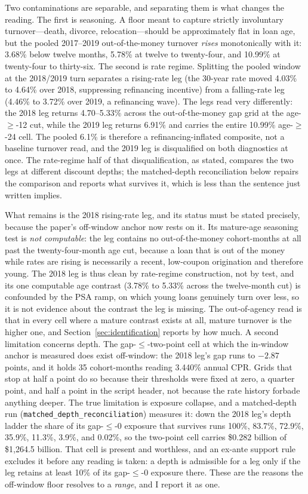 \documentclass[12pt]{article}
\begin{document}
Two contaminations are separable, and separating them is what changes the reading. The first is seasoning. A floor meant to capture strictly involuntary turnover---death, divorce, relocation---should be approximately flat in loan age, but the pooled 2017--2019 out-of-the-money turnover \emph{rises} monotonically with it: 3.68\% below twelve months, 5.78\% at twelve to twenty-four, and 10.99\% at twenty-four to thirty-six. The second is rate regime. Splitting the pooled window at the 2018/2019 turn separates a rising-rate leg (the 30-year rate moved 4.03\% to 4.64\% over 2018, suppressing refinancing incentive) from a falling-rate leg (4.46\% to 3.72\% over 2019, a refinancing wave). The legs read very differently: the 2018 leg returns 4.70--5.33\% across the out-of-the-money gap grid at the age-$\geq$-12 cut, while the 2019 leg returns 6.91\% and carries the entire 10.99\% age-$\geq$-24 cell. The pooled 6.1\% is therefore a refinancing-inflated composite, not a baseline turnover read, and the 2019 leg is disqualified on both diagnostics at once. The rate-regime half of that disqualification, as stated, compares the two legs at different discount depths; the matched-depth reconciliation below repairs the comparison and reports what survives it, which is less than the sentence just written implies.

What remains is the 2018 rising-rate leg, and its status must be stated precisely, because the paper's off-window anchor now rests on it. Its mature-age seasoning test is \emph{not computable}: the leg contains no out-of-the-money cohort-months at all past the twenty-four-month age cut, because a loan that is out of the money while rates are rising is necessarily a recent, low-coupon origination and therefore young. The 2018 leg is thus clean by rate-regime construction, not by test, and its one computable age contrast (3.78\% to 5.33\% across the twelve-month cut) is confounded by the PSA ramp, on which young loans genuinely turn over less, so it is not evidence about the contrast the leg is missing. The out-of-agency read is that in every cell where a mature contrast exists at all, mature turnover is the higher one, and Section~\ref{sec:identification} reports by how much. A second limitation concerns depth. The gap-$\leq$-two-point cell at which the in-window anchor is measured does exist off-window: the 2018 leg's gap runs to $-2.87$ points, and it holds 35 cohort-months reading 3.440\% annual CPR. Grids that stop at half a point do so because their thresholds were fixed at zero, a quarter point, and half a point in the script header, not because the rate history forbade anything deeper. The true limitation is exposure collapse, and a matched-depth run (\texttt{matched\_depth\_reconciliation}) measures it: down the 2018 leg's depth ladder the share of its gap-$\leq$-0 exposure that survives runs 100\%, 83.7\%, 72.9\%, 35.9\%, 11.3\%, 3.9\%, and 0.02\%, so the two-point cell carries \$0.282 billion of \$1{,}264.5 billion. That cell is present and worthless, and an ex-ante support rule excludes it before any reading is taken: a depth is admissible for a leg only if the leg retains at least 10\% of its gap-$\leq$-0 exposure there. These are the reasons the off-window floor resolves to a \emph{range}, and I report it as one.
\end{document}
